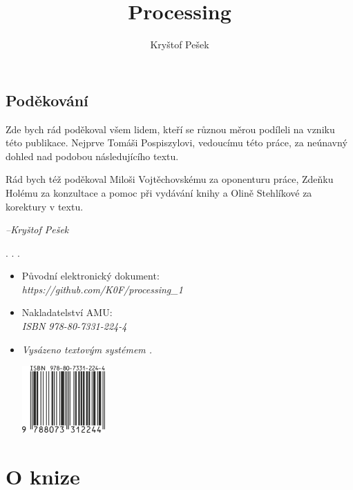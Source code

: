\documentclass[10pt]{book}
\title{Processing}
\author{Kryštof Pešek}
\date{} %
\newcommand{\oddil}[1]{\section{#1}\index{#1}\label{#1}}
\begin{document}

\makeglossaries



\thispagestyle{empty}
\oddil{Poděkování}
Zde bych rád poděkoval všem lidem, kteří se různou měrou podíleli na vzniku této publikace. Nejprve Tomáši Pospiszylovi, vedoucímu této práce, za neúnavný dohled nad podobou následujícího textu.

Rád bych též poděkoval Miloši Vojtěchovskému za oponenturu práce, Zdeňku Holému za konzultace a pomoc při vydávání knihy a Olině Stehlíkové za korektury v textu.


\vfill

\begin{flushright}
{\em \footnotesize{--Kryštof Pešek}}
\end{flushright}



\thispagestyle{empty}
.
\newpage
.
\thispagestyle{empty}
\newpage
.
\thispagestyle{empty}


\vfill

\begin{itemize}
\item
Původní elektronický dokument: \\
{\em https://github.com/K0F/processing\_1}
\item
Nakladatelství AMU: \\
{\em ISBN 978-80-7331-224-4}
\item
{\em Vysázeno textovým systémem \XeLaTeX.}

\begin{center}
\includegraphics[width=0.25\textwidth]{imgs/barcode.png}
\end{center}

\end{itemize}



\thispagestyle{empty}



\tableofcontents


\chapter{O knize}
\end{document}
